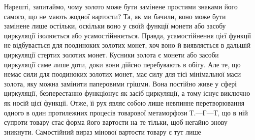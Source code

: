 Нарешті, запитаймо, чому золото може бути замінене простими
знаками його самого, що не мають жодної вартости? Та, як ми
бачили, воно може бути замінене лише остільки, оскільки воно
у своїй функції монети або засобу циркуляції ізолюється або
усамостійнюється. Правда, усамостійнення цієї функції не відбувається
для поодиноких золотих монет, хоч воно й виявляється
в дальшій циркуляції стертих золотих монет. Кусники золота
є монети або засоби циркуляції саме лише доти, доки вони дійсно
перебувають в обігу. Але те, що немає сили для поодиноких золотих
монет, має силу для тієї мінімальної маси золота, яку можна
замінити паперовими грішми. Вона постійно живе у сфері циркуляції,
безперестанно функціонує як засіб циркуляції, а тому
існує виключно як носій цієї функції. Отже, її рух являє собою
лише невпинне перетворювання одного в один протилежних процесів
товарової метаморфози $Т. — Г — Т$, що в ній супроти товару
стає форма його вартости на те тільки, щоб негайно знову зникнути.
Самостійний вираз мінової вартости товару є тут лише
\parbreak{}  %
